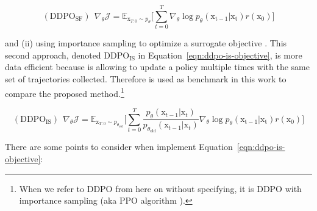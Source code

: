 \begin{equation}\label{eqn:ddpo-sf-objective}
 (\text{DDPO}_{\text{SF}})~~ \nabla_{\theta}\mathcal{J} = \mathbb{E}_{\mathrm{x}_{T:0}\sim p_{\theta}} \bigg[\sum_{t=0}^{T}\nabla_{\theta}\log p_{\theta}(\mathrm{x_{t-1}|\mathrm{x}_t}) r(\mathrm{x}_{0})\bigg]
\end{equation}

\noindent and (ii) using importance sampling to optimize a surrogate objective \cite{schulman2015trust, schulman2017proximal}. This second approach, denoted $\text{DDPO}_{\text{IS}}$ in Equation~\eqref{eqn:ddpo-is-objective}, is more data efficient because is allowing to update a policy multiple times with the same set of trajectories collected. Therefore is used as benchmark in this work to compare the proposed method.\footnote{When we refer to DDPO from here on without specifying, it is DDPO with importance sampling (aka PPO algorithm \citep{schulman2017proximal}).} 

\begin{equation}\label{eqn:ddpo-is-objective}
    (\text{DDPO}_{\text{IS}})~~ \nabla_{\theta}\mathcal{J} = \mathbb{E}_{\mathrm{x}_{T:0}\sim p_{\theta_{\text{old}}}} \bigg[\sum_{t=0}^{T}\frac{p_{\theta}(\mathrm{x}_{t-1}|\mathrm{x}_{t})}{p_{\theta_{\text{old}}}(\mathrm{x}_{t-1}|\mathrm{x}_{t})}\nabla_{\theta}\log p_{\theta}(\mathrm{x_{t-1}|\mathrm{x}_t}) r(\mathrm{x}_{0})\bigg]
\end{equation}

\noindent There are some points to consider when implement Equation~\ref{eqn:ddpo-is-objective}:

